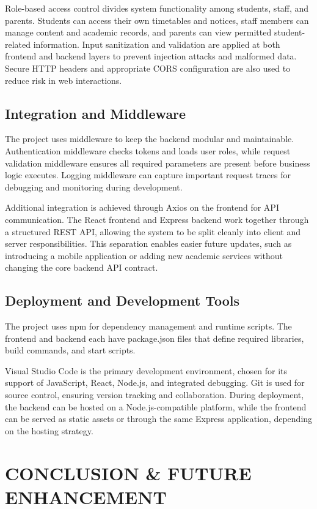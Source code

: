 \documentclass{article}
\begin{document}
Role-based access control divides system functionality among students, staff, and parents. Students can access their own timetables and notices, staff members can manage content and academic records, and parents can view permitted student-related information. Input sanitization and validation are applied at both frontend and backend layers to prevent injection attacks and malformed data. Secure HTTP headers and appropriate CORS configuration are also used to reduce risk in web interactions.

\subsection{Integration and Middleware}
The project uses middleware to keep the backend modular and maintainable. Authentication middleware checks tokens and loads user roles, while request validation middleware ensures all required parameters are present before business logic executes. Logging middleware can capture important request traces for debugging and monitoring during development.

Additional integration is achieved through Axios on the frontend for API communication. The React frontend and Express backend work together through a structured REST API, allowing the system to be split cleanly into client and server responsibilities. This separation enables easier future updates, such as introducing a mobile application or adding new academic services without changing the core backend API contract.

\subsection{Deployment and Development Tools}
The project uses npm for dependency management and runtime scripts. The frontend and backend each have package.json files that define required libraries, build commands, and start scripts.

Visual Studio Code is the primary development environment, chosen for its support of JavaScript, React, Node.js, and integrated debugging. Git is used for source control, ensuring version tracking and collaboration. During deployment, the backend can be hosted on a Node.js-compatible platform, while the frontend can be served as static assets or through the same Express application, depending on the hosting strategy.

\section{CONCLUSION \& FUTURE ENHANCEMENT}
\end{document}
